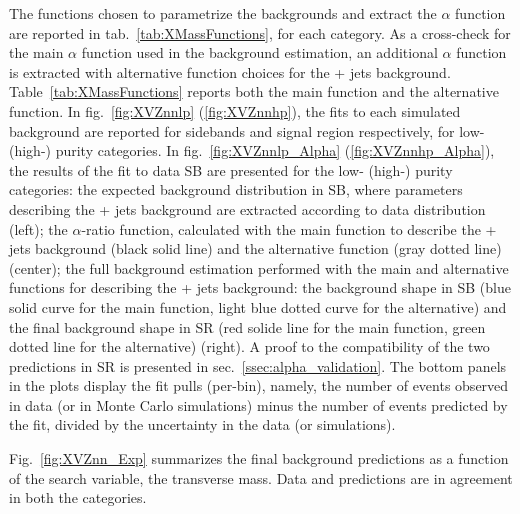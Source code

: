\noindent The functions chosen to parametrize the backgrounds and extract the $\alpha$ function are reported in tab.~\ref{tab:XMassFunctions}, for each category. As a cross-check for the main $\alpha$ function used in the background estimation, an additional $\alpha$ function is extracted with alternative function choices for the \V + jets background. Table~\ref{tab:XMassFunctions} reports both the main function and the alternative function. In fig.~\ref{fig:XVZnnlp} (\ref{fig:XVZnnhp}), the fits to each simulated background are reported for sidebands and signal region respectively, for low- (high-) purity categories. In fig.~\ref{fig:XVZnnlp_Alpha} (\ref{fig:XVZnnhp_Alpha}), the results of the fit to data SB are presented for the low- (high-) purity categories: the expected background distribution in SB, where parameters describing the \V + jets background are extracted according to data distribution (left); the $\alpha$-ratio function, calculated with the main function to describe the \V + jets background (black solid line) and the alternative function (gray dotted line) (center); the full background estimation performed with the main and alternative functions for describing the \V + jets background: the background shape in SB (blue solid curve for the main function, light blue dotted curve for the alternative) and the final background shape in SR (red solide line for the main function, green dotted line for the alternative) (right). A proof to the compatibility of the two predictions in SR is presented in sec.~\ref{ssec:alpha_validation}. The bottom panels in the plots display the fit pulls (per-bin), namely, the number of events observed in data (or in Monte Carlo simulations) minus the number of events predicted by the fit, divided by the uncertainty in the data (or simulations). 











\noindent Fig.~\ref{fig:XVZnn_Exp} summarizes the final background predictions as a function of the search variable, the transverse mass. Data and predictions are in agreement in both the categories. 

